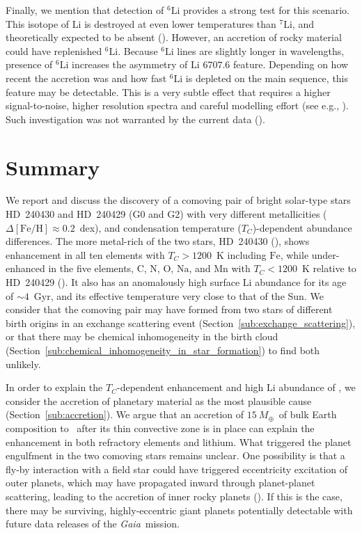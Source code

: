 \documentclass[modern, letterpaper]{aastex61}
\newcommand{\project}[1]{\textsl{#1}}
\newcommand{\gaia}{\project{Gaia}}
\newcommand{\sectionname}{Section}
\newcommand*\elem[1]{\ensuremath{\mathrm{#1}}}
\newcommand*\elemH[1]{\ensuremath{[\mathrm{#1}/\elem{H}]}}
\newcommand*{\feh}{\ensuremath{\elemH{Fe}}}
\newcommand{\sunanalog}{\text{Krios}}
\newcommand{\bizarreone}{\text{Kronos}}
\newcommand{\Tcondens}{\ensuremath{T_C}}
\newcommand{\mearth}{\ensuremath{M_\oplus}}
\newcommand{\maccreted}{\ensuremath{15~\mearth}}
\begin{document}
Finally, we mention that detection of $^6 \elem{Li}$ provides a strong test for
this scenario.
This isotope of \elem{Li} is destroyed at even lower temperatures than
$^7\elem{Li}$, and theoretically expected to be absent
(\citealt{1997ARA&A..35..557P}).
However, an accretion of rocky material could have replenished $^6 \elem{Li}$.
Because $^6\elem{Li}$ lines are slightly longer in wavelengths,
presence of $^6\elem{Li}$ increases the asymmetry of \elem{Li} $6707.6$ feature.
Depending on how recent the accretion was and how fast $^6 \elem{Li}$ is
depleted on the main sequence, this feature may be detectable.
This is a very subtle effect that requires a higher signal-to-noise, higher
resolution spectra and careful modelling effort
(see e.g., \citealt{Israelian:2001,2002MNRAS.335.1005R}).
Such investigation was not warranted by the current data (\citealt{jmlithium}).

\section{Summary}
\label{sec:summary}

We report and discuss the discovery of a comoving pair of bright
solar-type stars HD~240430 and HD~240429 (G0 and G2) with very different
metallicities ($\Delta\feh \approx 0.2$~dex), and condensation temperature
(\Tcondens)-dependent abundance differences.
The more metal-rich of the two stars, HD~240430 (\bizarreone), shows enhancement in
all ten elements with $\Tcondens > 1200$~K including \elem{Fe}, while
under-enhanced in the five elements, \elem{C}, \elem{N}, \elem{O}, \elem{Na}, and
\elem{Mn} with $\Tcondens < 1200$~K relative to HD~240429 (\sunanalog).
It also has an anomalously high surface \elem{Li} abundance for its age of
$\sim 4$~Gyr, and its effective temperature very close to that of the Sun.
We consider that the comoving pair may have formed from two stars of different
birth origins in an exchange scattering event
(\sectionname~\ref{sub:exchange_scattering}), or that there may be chemical
inhomogeneity in the birth cloud
(\sectionname~\ref{sub:chemical_inhomogeneity_in_star_formation}) to find
both unlikely.

In order to explain the $\Tcondens$-dependent enhancement and high \elem{Li}
abundance of \bizarreone, we consider the accretion of planetary material as the
most plausible cause (\sectionname~\ref{sub:accretion}).
We argue that an accretion of \maccreted\ of bulk Earth composition to
\bizarreone\ after its thin convective zone is in place can explain the
enhancement in both refractory elements and lithium.
What triggered the planet engulfment in the two comoving stars remains unclear.
One possibility is that a fly-by interaction with a field star could have
triggered eccentricity excitation of outer planets, which may
have propagated inward through planet-planet scattering, leading to the
accretion of inner rocky planets (\citealt{Zakamska:2004aa,Malmberg:2011aa}).
If this is the case, there may be surviving, highly-eccentric giant planets
potentially detectable with future data releases of the \gaia\ mission.
\end{document}
